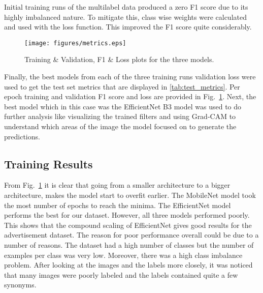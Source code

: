 \documentclass[conference]{IEEEtran}
\begin{document}
Initial training runs of the multilabel data produced a zero F1 score due to its highly imbalanced
 nature. To mitigate this, class wise weights were calculated and used with the loss function. 
 This improved the F1 score quite considerably.

\begin{figure}[htbp]
    \centering
    \texttt{[image: figures/metrics.eps]}  
    \caption{Training \& Validation, F1 \& Loss plots for the three models.}
    \label{fig:acc_loss}
  \end{figure}


Finally, the best models from each of the three training runs validation loss were used 
to get the test set metrics that are displayed in \ref{tab:test_metrics}. 
Per epoch training and validation F1 score and loss are provided in 
Fig.~\ref{fig:acc_loss}. Next, the best model which in this case was the EfficientNet B3 model 
was used to do further analysis like visualizing the trained filters and using Grad-CAM to 
understand which areas of the image the model focused on to generate the predictions. 

\subsection{Training Results}
From Fig.~\ref{fig:acc_loss} it is clear that going from a smaller 
architecture to a bigger architecture, makes the model start to overfit earlier. 
The MobileNet model took the most number of epochs to reach the minima. The EfficientNet model 
performs the best for our dataset. However, all three models performed poorly. This shows that the 
compound scaling of EfficientNet gives good results for the advertisement dataset. The reason for 
poor performance overall could be due to a number of reasons. 
The dataset had a high number of classes but the number of examples per class was very low.
Moreover, there was a high class imbalance problem. After looking at the images and 
the labels more closely, it was noticed that many images were poorly labeled and the 
labels contained quite a few synonyms. 
\end{document}
